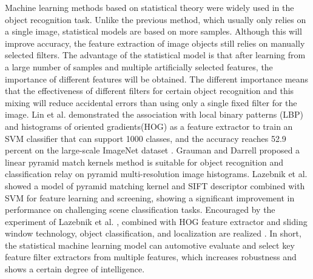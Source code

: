 \documentclass[10pt, a4paper]{IEEEtran} %
\begin{document}
	\par
	Machine learning methods based on statistical theory were widely used in the object recognition task. Unlike the previous method, which usually only relies on a single image, statistical models are based on more samples. Although this will improve accuracy, the feature extraction of image objects still relies on manually selected filters. The advantage of the statistical model is that after learning from a large number of samples and multiple artificially selected features, the importance of different features will be obtained. The different importance means that the effectiveness of different filters for certain object recognition and this mixing will reduce accidental errors than using only a single fixed filter for the image. Lin et al. \cite{lin2011large} demonstrated the association with local binary patterns (LBP) and histograms of oriented gradients(HOG) as a feature extractor to train an SVM classifier that can support 1000 classes, and the accuracy reaches 52.9 percent on the large-scale ImageNet dataset \cite{dalal2005histograms}\cite{wang2009hog}\cite{deng2009imagenet}. Grauman and Darrell \cite{grauman2005pyramid} proposed a linear pyramid match kernels method is suitable for object recognition and classification relay on pyramid multi-resolution image histograms. Lazebnik et al. \cite{lazebnik2006beyond} showed a model of pyramid matching kernel and SIFT descriptor combined with SVM for feature learning and screening, showing a significant improvement in performance on challenging scene classification tasks. Encouraged by the experiment of Lazebnik et al. \cite{lazebnik2006beyond}, combined with HOG feature extractor and sliding window technology, object classification, and localization are realized \cite{harzallah2009combining}. In short, the statistical machine learning model can automotive evaluate and select key feature filter extractors from multiple features, which increases robustness and shows a certain degree of intelligence.
	\par
\end{document}
